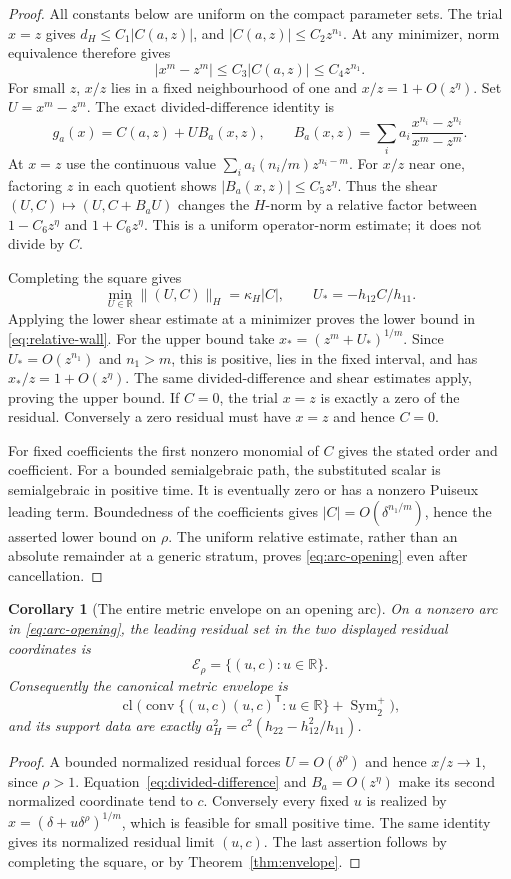\documentclass[11pt,reqno]{amsart}
\numberwithin{equation}{section}
\newtheorem{corollary}[theorem]{Corollary}
\theoremstyle{definition}
\theoremstyle{remark}
\newcommand{\R}{\mathbb R}
\newcommand{\Sym}{\operatorname{Sym}}
\newcommand{\cl}{\operatorname{cl}}
\newcommand{\cE}{\mathcal E}
\begin{document}
\begin{proof}
All constants below are uniform on the compact parameter sets. The trial $x=z$ gives $d_H\le C_1|C(a,z)|$, and $|C(a,z)|\le C_2z^{n_1}$. At any minimizer, norm equivalence therefore gives
\[
 |x^m-z^m|\le C_3|C(a,z)|\le C_4z^{n_1}.
\]
For small $z$, $x/z$ lies in a fixed neighbourhood of one and
$x/z=1+O(z^\eta)$. Set $U=x^m-z^m$. The exact divided-difference identity is
\begin{equation}\label{eq:divided-difference}
 g_a(x)=C(a,z)+U B_a(x,z),\qquad
 B_a(x,z)=\sum_i a_i\frac{x^{n_i}-z^{n_i}}{x^m-z^m}.
\end{equation}
At $x=z$ use the continuous value $\sum_i a_i(n_i/m)z^{n_i-m}$. For $x/z$ near one, factoring $z$ in each quotient shows $|B_a(x,z)|\le C_5z^\eta$. Thus the shear $(U,C)\mapsto(U,C+B_aU)$ changes the $H$-norm by a relative factor between $1-C_6z^\eta$ and $1+C_6z^\eta$. This is a uniform operator-norm estimate; it does not divide by $C$.

Completing the square gives
\[
 \min_{U\in\R}\|(U,C)\|_H
       =\kappa_H|C|,\qquad U_*=-h_{12}C/h_{11}.
\]
Applying the lower shear estimate at a minimizer proves the lower bound in \eqref{eq:relative-wall}. For the upper bound take $x_*=(z^m+U_*)^{1/m}$. Since $U_*=O(z^{n_1})$ and $n_1>m$, this is positive, lies in the fixed interval, and has $x_*/z=1+O(z^\eta)$. The same divided-difference and shear estimates apply, proving the upper bound. If $C=0$, the trial $x=z$ is exactly a zero of the residual. Conversely a zero residual must have $x=z$ and hence $C=0$.

For fixed coefficients the first nonzero monomial of $C$ gives the stated order and coefficient. For a bounded semialgebraic path, the substituted scalar is semialgebraic in positive time. It is eventually zero or has a nonzero Puiseux leading term. Boundedness of the coefficients gives $|C|=O(\delta^{n_1/m})$, hence the asserted lower bound on $\rho$. The uniform relative estimate, rather than an absolute remainder at a generic stratum, proves \eqref{eq:arc-opening} even after cancellation.
\end{proof}

\begin{corollary}[The entire metric envelope on an opening arc]\label{cor:wall-envelope}
On a nonzero arc in \eqref{eq:arc-opening}, the leading residual set in the two displayed residual coordinates is
\[
 \cE_\rho=\{(u,c):u\in\R\}.
\]
Consequently the canonical metric envelope is
\[
 \cl\bigl(\operatorname{conv}
   \{(u,c)(u,c)^{\mathsf T}:u\in\R\}+\Sym_2^+\bigr),
\]
and its support data are exactly $a_H^2=c^2(h_{22}-h_{12}^2/h_{11})$.
\end{corollary}
\begin{proof}
A bounded normalized residual forces $U=O(\delta^\rho)$ and hence $x/z\to1$, since $\rho>1$. Equation~\eqref{eq:divided-difference} and $B_a=O(z^\eta)$ make its second normalized coordinate tend to $c$. Conversely every fixed $u$ is realized by $x=(\delta+u\delta^\rho)^{1/m}$, which is feasible for small positive time. The same identity gives its normalized residual limit $(u,c)$. The last assertion follows by completing the square, or by Theorem~\ref{thm:envelope}.
\end{proof}
\end{document}
